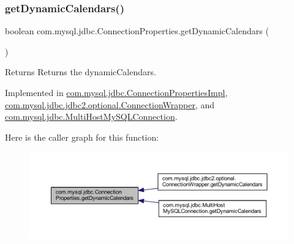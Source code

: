 \subsubsection{\texorpdfstring{get\+Dynamic\+Calendars()}{getDynamicCalendars()}}
{\footnotesize\ttfamily boolean com.\+mysql.\+jdbc.\+Connection\+Properties.\+get\+Dynamic\+Calendars (\begin{DoxyParamCaption}{ }\end{DoxyParamCaption})}

\begin{DoxyReturn}{Returns}
Returns the dynamic\+Calendars. 
\end{DoxyReturn}


Implemented in \mbox{\hyperlink{classcom_1_1mysql_1_1jdbc_1_1_connection_properties_impl_ace467e9ed5808a6a4d40e65fe10480f4}{com.\+mysql.\+jdbc.\+Connection\+Properties\+Impl}}, \mbox{\hyperlink{classcom_1_1mysql_1_1jdbc_1_1jdbc2_1_1optional_1_1_connection_wrapper_a0b2ae292dd1bf086fa44c57a0cc34264}{com.\+mysql.\+jdbc.\+jdbc2.\+optional.\+Connection\+Wrapper}}, and \mbox{\hyperlink{classcom_1_1mysql_1_1jdbc_1_1_multi_host_my_s_q_l_connection_a680a95f48f0e52a86bcf911f209afaa3}{com.\+mysql.\+jdbc.\+Multi\+Host\+My\+S\+Q\+L\+Connection}}.

Here is the caller graph for this function\+:\nopagebreak
\begin{figure}[H]
\begin{center}
\leavevmode
\includegraphics[width=350pt]{interfacecom_1_1mysql_1_1jdbc_1_1_connection_properties_aa8a465589df5cfff61d5903b1cb6fb85_icgraph}
\end{center}
\end{figure}
\mbox{\label{interfacecom_1_1mysql_1_1jdbc_1_1_connection_properties_ad0c5071cd7d12eadb159a6b0cf8066c3}} 
